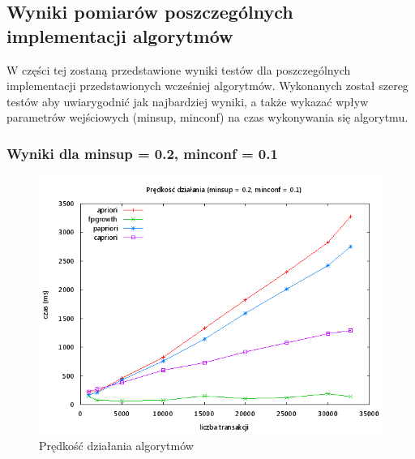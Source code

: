 \subsection{Wyniki pomiarów poszczególnych implementacji algorytmów}

W części tej zostaną przedstawione wyniki testów dla poszczególnych implementacji przedstawionych wcześniej algorytmów. Wykonanych został szereg testów aby uwiarygodnić jak najbardziej wyniki, a także wykazać wpływ parametrów wejściowych (minsup, minconf) na czas wykonywania się algorytmu.


\subsubsection{Wyniki dla minsup = 0.2, minconf = 0.1}

\begin{figure}[H]
\centering
\includegraphics[width=1.1\textwidth]{figures/06/02_01.png}
\caption{Prędkość działania algorytmów\label{rys:02_01}}
\end{figure}

